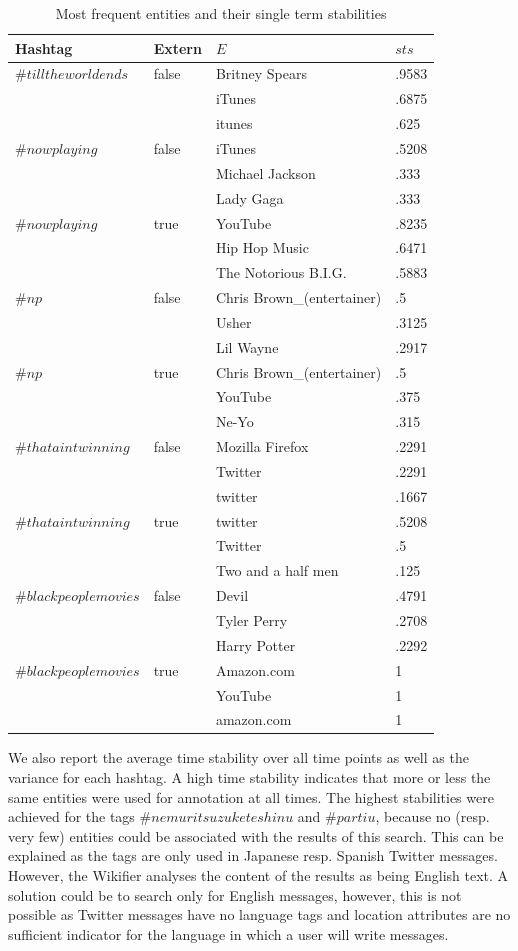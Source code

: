 \documentclass{llncs}
\begin{document}
\begin{table}[ht]
\centering
\small
\begin{tabular}{l|l|l|l}
Hashtag & Extern & $E$ & $sts$ \\%
\hline
$\#tilltheworldends$ & false & Britney Spears & .9583 \\
& &  iTunes & .6875 \\
& &  itunes & .625 \\ 
\hline
$\#nowplaying$ & false & iTunes & .5208 \\
& & Michael Jackson & .333 \\
& & Lady Gaga & .333 \\
\hline
$\#nowplaying$ & true & YouTube & .8235 \\
& & Hip Hop Music & .6471 \\
& & The Notorious B.I.G. & .5883 \\
\hline
$\#np$ & false & Chris Brown\_(entertainer) & .5 \\
& & Usher & .3125 \\
& & Lil Wayne & .2917 \\
\hline
$\#np$ & true & Chris Brown\_(entertainer) & .5 \\
& & YouTube & .375 \\
& & Ne-Yo & .315 \\
\hline
$\#thataintwinning$ & false & Mozilla Firefox & .2291 \\
& & Twitter & .2291 \\
& & twitter & .1667 \\
\hline
$\#thataintwinning$ & true & twitter & .5208 \\
& & Twitter & .5 \\
& & Two and a half men & .125 \\
\hline
$\#blackpeoplemovies$ & false & Devil & .4791 \\
& & Tyler Perry & .2708 \\
& & Harry Potter & .2292 \\
\hline
$\#blackpeoplemovies$ & true & Amazon.com & 1 \\
& & YouTube & 1 \\
& & amazon.com & 1
\end{tabular}
\label{tbl:entities}
\caption{Most frequent entities and their single term stabilities}
\end{table}

We also report the average time stability over all time points as well as the variance for each hashtag. A high time stability indicates that more or less the same entities were used for annotation at all times. The highest stabilities were achieved for the tags $\#nemuritsuzuketeshinu$ and $\#partiu$, because no (resp. very few) entities could be associated with the results of this search. This can be explained as the tags are only used in Japanese resp. Spanish Twitter messages. However, the Wikifier analyses the content of the results as being English text. A solution could be to search only for English messages, however, this is not possible as Twitter messages have no language tags and location attributes are no sufficient indicator for the language in which a user will write messages.
\end{document}
